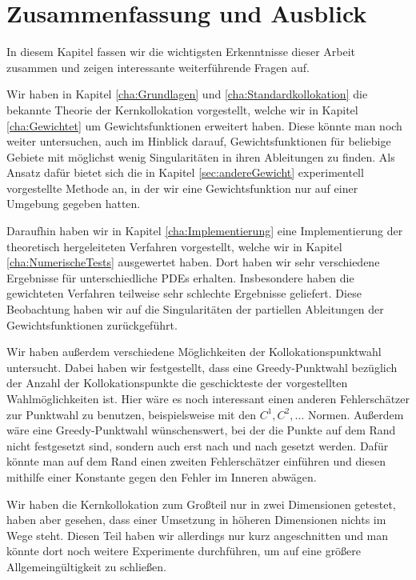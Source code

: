 \chapter{Zusammenfassung und Ausblick}
\label{cha:schluss}

In diesem Kapitel fassen wir die wichtigsten Erkenntnisse dieser Arbeit zusammen und zeigen interessante weiterführende Fragen auf.

Wir haben in Kapitel \ref{cha:Grundlagen} und \ref{cha:Standardkollokation} die bekannte Theorie der Kernkollokation vorgestellt, welche wir in Kapitel \ref{cha:Gewichtet} um Gewichtsfunktionen erweitert haben. Diese könnte man noch weiter untersuchen, auch im Hinblick darauf, Gewichtsfunktionen für beliebige Gebiete mit möglichst wenig Singularitäten in ihren Ableitungen zu finden. Als Ansatz dafür bietet sich die in Kapitel \ref{sec:andereGewicht} experimentell vorgestellte Methode an, in der wir eine Gewichtsfunktion nur auf einer Umgebung gegeben hatten.

Daraufhin haben wir in Kapitel \ref{cha:Implementierung} eine Implementierung der theoretisch hergeleiteten Verfahren vorgestellt, welche wir in Kapitel \ref{cha:NumerischeTests} ausgewertet haben. Dort haben wir sehr verschiedene Ergebnisse für unterschiedliche \acp{PDE} erhalten. Insbesondere haben die gewichteten Verfahren teilweise sehr schlechte Ergebnisse geliefert. Diese Beobachtung haben wir auf die Singularitäten der partiellen Ableitungen der Gewichtsfunktionen zurückgeführt.

Wir haben außerdem verschiedene Möglichkeiten der Kollokationspunktwahl untersucht. Dabei haben wir festgestellt, dass eine Greedy-Punktwahl bezüglich der Anzahl der Kollokationspunkte die geschickteste der vorgestellten Wahlmöglichkeiten ist. Hier wäre es noch interessant einen anderen Fehlerschätzer zur Punktwahl zu benutzen, beispielsweise mit den $C^1, C^2, \dots$ Normen. Außerdem wäre eine Greedy-Punktwahl wünschenswert, bei der die Punkte auf dem Rand nicht festgesetzt sind, sondern auch erst nach und nach gesetzt werden. Dafür könnte man auf dem Rand einen zweiten Fehlerschätzer einführen und diesen mithilfe einer Konstante gegen den Fehler im Inneren abwägen.

Wir haben die Kernkollokation zum Großteil nur in zwei Dimensionen getestet, haben aber gesehen, dass einer Umsetzung in höheren Dimensionen nichts im Wege steht. Diesen Teil haben wir allerdings nur kurz angeschnitten und man könnte dort noch weitere Experimente durchführen, um auf eine größere Allgemeingültigkeit zu schließen.
